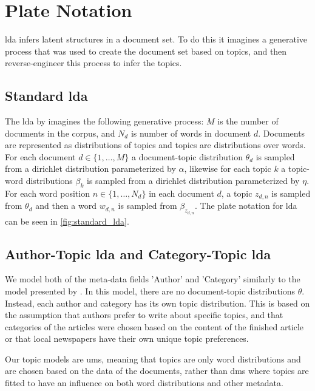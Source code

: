 \section{Plate Notation}
\Gls{lda} infers latent structures in a document set. 
To do this it imagines a generative process that was used to create the document set based on topics, and then reverse-engineer this process to infer the topics.

\subsection{Standard \gls{lda}}
The \gls{lda} by \citet{blei2003latent} imagines the following generative process:
$M$ is the number of documents in the corpus, and $N_d$ is number of words in document $d$.
Documents are represented as distributions of topics and topics are distributions over words.
For each document $d \in \{1,\dots, M\}$ a document-topic distribution $\theta_d$ is sampled from a dirichlet distribution parameterized by $\alpha$, likewise for each topic $k$ a topic-word distributions $\beta_k$ is sampled from a dirichlet distribution parameterized by $\eta$.
For each word position $n \in \{1, \dots, N_d\}$ in each document $d$, a topic $z_{d,n}$ is sampled from $\theta_d$ and then a word $w_{d,n}$ is sampled from $\beta_{z_{d,n}}$.
The plate notation for \gls{lda} can be seen in \autoref{fig:standard_lda}.



\subsection{Author-Topic \gls{lda} and Category-Topic \gls{lda}}
We model both of the meta-data fields 'Author' and 'Category' similarly to the model presented by \citet{author_topic_2012}.
In this model, there are no document-topic distributions $\theta$.
Instead, each author and category has its own topic distribution.
This is based on the assumption that authors prefer to write about specific topics, and that categories of the articles were chosen based on the content of the finished article or that local newspapers have their own unique topic preferences.

Our topic models are \glspl{um}, meaning that topics are only word distributions and are chosen based on the data of the documents, rather than \glspl{dm} where topics are fitted to have an influence on both word distributions and other metadata.

